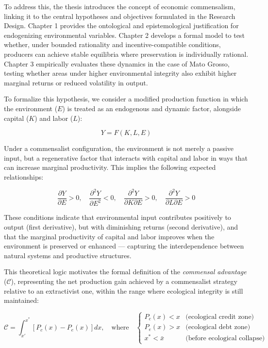 To address this, the thesis introduces the concept of economic commensalism, linking it to the central hypotheses and objectives formulated in the Research Design. Chapter 1 provides the ontological and epistemological justification for endogenizing environmental variables. Chapter 2 develops a formal model to test whether, under bounded rationality and incentive-compatible conditions, producers can achieve stable equilibria where preservation is individually rational. Chapter 3 empirically evaluates these dynamics in the case of Mato Grosso, testing whether areas under higher environmental integrity also exhibit higher marginal returns or reduced volatility in output.

To formalize this hypothesis, we consider a modified production function in which the environment ($E$) is treated as an endogenous and dynamic factor, alongside capital ($K$) and labor ($L$):

\[
Y = F(K, L, E)
\]

Under a commensalist configuration, the environment is not merely a passive input, but a regenerative factor that interacts with capital and labor in ways that can increase marginal productivity. This implies the following expected relationships:

\[
\frac{\partial Y}{\partial E} > 0, \quad 
\frac{\partial^2 Y}{\partial E^2} < 0, \quad
\frac{\partial^2 Y}{\partial K \partial E} > 0, \quad
\frac{\partial^2 Y}{\partial L \partial E} > 0
\]

\vspace{1em}

These conditions indicate that environmental input contributes positively to output (first derivative), but with diminishing returns (second derivative), and that the marginal productivity of capital and labor improves when the environment is preserved or enhanced — capturing the interdependence between natural systems and productive structures.

\vspace{1em}

This theoretical logic motivates the formal definition of the \textit{commensal advantage} ($\mathcal{C}$), representing the net production gain achieved by a commensalist strategy relative to an extractivist one, within the range where ecological integrity is still maintained:

\[
\mathcal{C} = 
\int_{x'}^{x^*} \left[ P_c(x) - P_e(x) \right] dx, 
\quad \text{where} \quad 
\begin{cases}
P_c(x) < x & \text{(ecological credit zone)} \\
P_e(x) > x & \text{(ecological debt zone)} \\
x^* < \bar{x} & \text{(before ecological collapse)}
\end{cases}
\]

